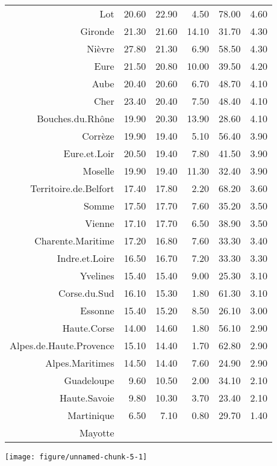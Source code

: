 \documentclass[11pt,a4paper]{article}\usepackage[]{graphicx}\usepackage[]{color}
\makeatletter
\def\maxwidth{ %
  \ifdim\Gin@nat@width>\linewidth
    \linewidth
  \else
    \Gin@nat@width
  \fi
}
\newenvironment{knitrout}{}{} %
\makeatother
\begin{document}
\begin{table}[H]
\begin{tabular}{rrrrrr}
  Lot & 20.60 & 22.90 & 4.50 & 78.00 & 4.60 \\ 
  Gironde & 21.30 & 21.60 & 14.10 & 31.70 & 4.30 \\ 
  Nièvre & 27.80 & 21.30 & 6.90 & 58.50 & 4.30 \\ 
  Eure & 21.50 & 20.80 & 10.00 & 39.50 & 4.20 \\ 
  Aube & 20.40 & 20.60 & 6.70 & 48.70 & 4.10 \\ 
  Cher & 23.40 & 20.40 & 7.50 & 48.40 & 4.10 \\ 
  Bouches.du.Rhône & 19.90 & 20.30 & 13.90 & 28.60 & 4.10 \\ 
  Corrèze & 19.90 & 19.40 & 5.10 & 56.40 & 3.90 \\ 
  Eure.et.Loir & 20.50 & 19.40 & 7.80 & 41.50 & 3.90 \\ 
  Moselle & 19.90 & 19.40 & 11.30 & 32.40 & 3.90 \\ 
  Territoire.de.Belfort & 17.40 & 17.80 & 2.20 & 68.20 & 3.60 \\ 
  Somme & 17.50 & 17.70 & 7.60 & 35.20 & 3.50 \\ 
  Vienne & 17.10 & 17.70 & 6.50 & 38.90 & 3.50 \\ 
  Charente.Maritime & 17.20 & 16.80 & 7.60 & 33.30 & 3.40 \\ 
  Indre.et.Loire & 16.50 & 16.70 & 7.20 & 33.30 & 3.30 \\ 
  Yvelines & 15.40 & 15.40 & 9.00 & 25.30 & 3.10 \\ 
  Corse.du.Sud & 16.10 & 15.30 & 1.80 & 61.30 & 3.10 \\ 
  Essonne & 15.40 & 15.20 & 8.50 & 26.10 & 3.00 \\ 
  Haute.Corse & 14.00 & 14.60 & 1.80 & 56.10 & 2.90 \\ 
  Alpes.de.Haute.Provence & 15.10 & 14.40 & 1.70 & 62.80 & 2.90 \\ 
  Alpes.Maritimes & 14.50 & 14.40 & 7.60 & 24.90 & 2.90 \\ 
  Guadeloupe & 9.60 & 10.50 & 2.00 & 34.10 & 2.10 \\ 
  Haute.Savoie & 9.80 & 10.30 & 3.70 & 23.40 & 2.10 \\ 
  Martinique & 6.50 & 7.10 & 0.80 & 29.70 & 1.40 \\ 
  Mayotte &  &  &  &  &  \\ 
   \hline
\end{tabular}
\end{table}



\begin{knitrout}
\color{fgcolor}
\texttt{[image: figure/unnamed-chunk-5-1]} 

\end{knitrout}
\end{document}
